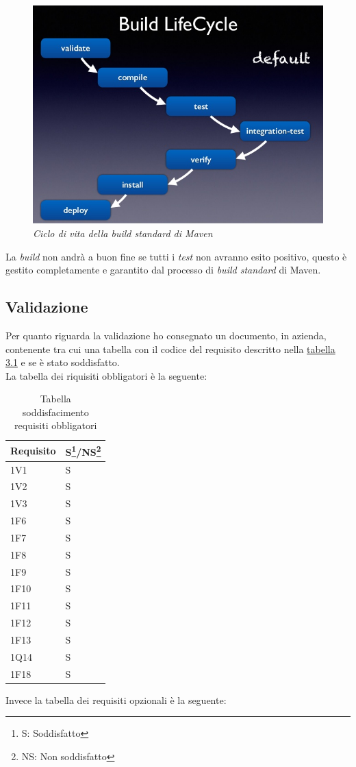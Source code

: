 \begin{figure}[!ht]
	\centering
	\includegraphics[scale=0.4]{immagini/build.jpg}
	\caption{\textit{Ciclo di vita della build standard di Maven }}
\end{figure}

La \textit{build} non andrà a buon fine se tutti i \textit{test} non avranno esito positivo, questo è gestito completamente e garantito dal processo di \textit{build standard} di Maven.
\subsection{Validazione}
Per quanto riguarda la validazione ho consegnato un documento, in azienda, contenente tra cui una tabella con il codice del requisito descritto nella \hyperlink{tab:rec}{tabella 3.1} e se è stato soddisfatto.\\
La tabella dei riquisiti obbligatori è la seguente:

\label{tab:pian}
\begin{table}[!ht]
\begin{tabularx}{.35\textwidth}{XX}
\hline\hline
\textbf{Requisito} & \textbf{S\footnote{S: Soddisfatto}/NS\footnote{NS: Non soddisfatto}} \\
\hline
1V1 & S\\
\hline
1V2 & S\\
\hline
1V3 & S\\
\hline
1F6 & S\\
\hline
1F7 & S\\
\hline
1F8 & S\\
\hline
1F9 & S\\
\hline
1F10 & S\\
\hline
1F11 & S\\
\hline
1F12 & S\\
\hline
1F13 & S\\
\hline
1Q14 & S\\
\hline
1F18 & S\\
\hline
\end{tabularx}
 \captionsetup{singlelinecheck = false, format= hang, justification=raggedright}
\caption{Tabella soddisfacimento requisiti obbligatori}
\end{table}%
\newpage
Invece la tabella dei requisiti opzionali è la seguente:


